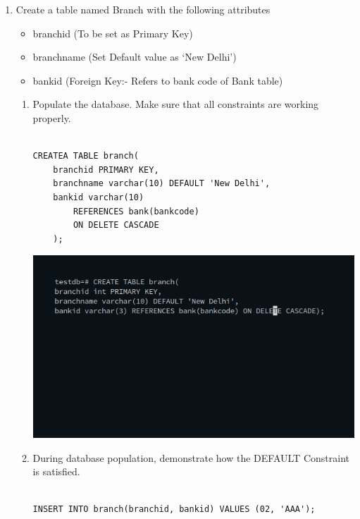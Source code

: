 \begin{enumerate}
\begin{enumerate}
\item Create a table named Branch with the following attributes
\begin{itemize}
\item branchid (To be set as Primary Key)
\item branchname (Set Default value as ‘New Delhi’)
\item bankid (Foreign Key:- Refers to bank code of Bank table)
\end{itemize}
\begin{enumerate}
\item Populate the database. Make sure that all constraints are working properly.\newline
\begin{verbatim}

CREATEA TABLE branch(
	branchid PRIMARY KEY,
	branchname varchar(10) DEFAULT 'New Delhi',
	bankid varchar(10) 
		REFERENCES bank(bankcode)
		ON DELETE CASCADE
	);

\end{verbatim}
\newline
\includegraphics[width=\linewidth]{../Images/Constraints/11.png}\newline
\item During database population, demonstrate how the DEFAULT Constraint is satisfied.\newline
\begin{verbatim}

INSERT INTO branch(branchid, bankid) VALUES (02, 'AAA');


\end{verbatim}
\end{enumerate}
\end{enumerate}
\end{enumerate}
